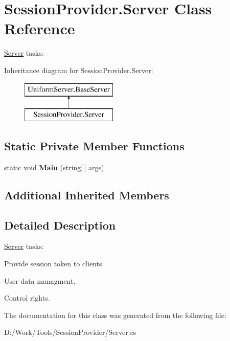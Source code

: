 \hypertarget{class_session_provider_1_1_server}{}\section{Session\+Provider.\+Server Class Reference}
\label{class_session_provider_1_1_server}


\mbox{\hyperlink{class_session_provider_1_1_server}{Server}} tasks\+:  


Inheritance diagram for Session\+Provider.\+Server\+:\begin{figure}[H]
\begin{center}
\leavevmode
\includegraphics[height=2.000000cm]{d8/d17/class_session_provider_1_1_server}
\end{center}
\end{figure}
\subsection*{Static Private Member Functions}
\begin{DoxyCompactItemize}
\item 
\mbox{\label{class_session_provider_1_1_server_a78068e966b78f7579b01ba80f53b87ea}} 
static void {\bfseries Main} (string\mbox{[}$\,$\mbox{]} args)
\end{DoxyCompactItemize}
\subsection*{Additional Inherited Members}


\subsection{Detailed Description}
\mbox{\hyperlink{class_session_provider_1_1_server}{Server}} tasks\+: 


\begin{DoxyItemize}
\item Provide session token to clients.
\item User data managment.
\item Control rights. 
\end{DoxyItemize}

The documentation for this class was generated from the following file\+:\begin{DoxyCompactItemize}
\item 
D\+:/\+Work/\+Tools/\+Session\+Provider/Server.\+cs\end{DoxyCompactItemize}
